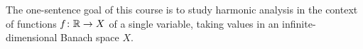 The one-sentence goal of this course is to study harmonic analysis in the context of functions $f \colon \mathbb{R} \rightarrow X$ of a single variable, taking values in an infinite-dimensional Banach space $X$.






